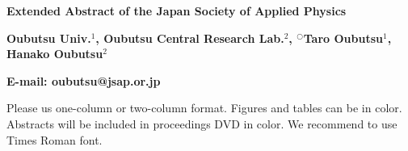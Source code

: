 \documentclass[a4paper,11pt]{article}
\begin{document}
\renewcommand{\baselinestretch}{1.12}\small\normalsize

\begin{center}
  \textbf{\Large Extended Abstract of the Japan Society of Applied Physics}
  
  \textbf{Oubutsu Univ.$^1$, Oubutsu Central Research Lab.$^2$, 
   $^\bigcirc$Taro Oubutsu$^1$, Hanako Oubutsu$^2$}
  
  \textbf{E-mail: oubutsu@jsap.or.jp}
\end{center}

Please us one-column or two-column format. Figures and tables can be in color. Abstracts will be included in proceedings DVD in color. We recommend to use Times Roman font.
\end{document}
